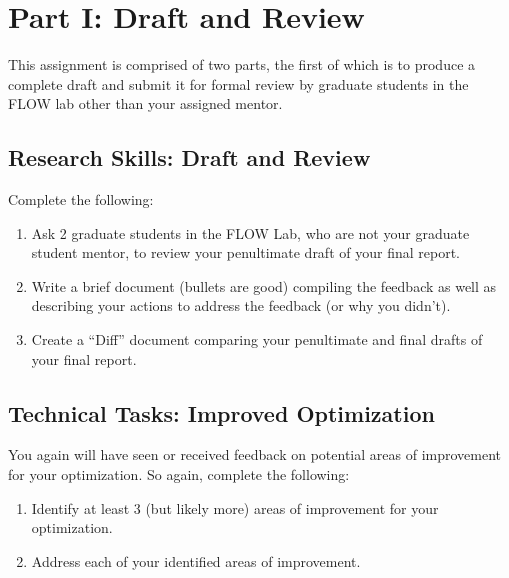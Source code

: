 \documentclass[12pt]{article}
\begin{document}
	
\section{Part I: Draft and Review}

This assignment is comprised of two parts, the first of which is to produce a complete draft and submit it for formal review by graduate students in the FLOW lab other than your assigned mentor.
	

\subsection{Research Skills: Draft and Review}
	
Complete the following:
\begin{enumerate}[label=\alph*.]
	\item Ask 2 graduate students in the FLOW Lab, who are not your graduate student mentor, to review your penultimate draft of your final report.
	\item Write a brief document (bullets are good) compiling the feedback as well as describing your actions to address the feedback (or why you didn't).
	\item Create a ``Diff'' document comparing your penultimate and final drafts of your final report.
\end{enumerate}
	
	
	

\subsection{Technical Tasks: Improved Optimization}

You again will have seen or received feedback on potential areas of improvement for your optimization.
So again, complete the following:

\begin{enumerate}[label=\alph*.]
	\item Identify at least 3 (but likely more) areas of improvement for your optimization.
	\item Address each of your identified areas of improvement.
\end{enumerate}
\end{document}
